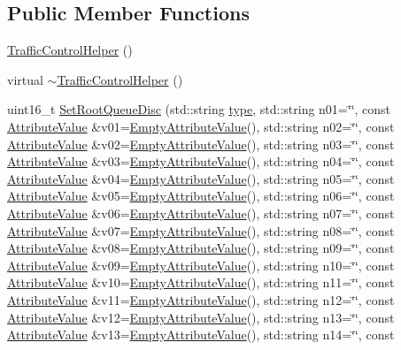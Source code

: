 \subsection*{Public Member Functions}
\begin{DoxyCompactItemize}
\item 
\hyperlink{classns3_1_1TrafficControlHelper_a291d5d95b297d432d58e71c7b111c33a}{Traffic\+Control\+Helper} ()
\item 
virtual \hyperlink{classns3_1_1TrafficControlHelper_a517f0ded11b5bfb23f9b20731c244be9}{$\sim$\+Traffic\+Control\+Helper} ()
\item 
uint16\+\_\+t \hyperlink{classns3_1_1TrafficControlHelper_a8588aac7a08e4dc4e7bb10fa7b9e25c8}{Set\+Root\+Queue\+Disc} (std\+::string \hyperlink{visualizer-ideas_8txt_add98db9e15e2a58cf2b57623e7aa893a}{type}, std\+::string n01=\char`\"{}\char`\"{}, const \hyperlink{classns3_1_1AttributeValue}{Attribute\+Value} \&v01=\hyperlink{classns3_1_1EmptyAttributeValue}{Empty\+Attribute\+Value}(), std\+::string n02=\char`\"{}\char`\"{}, const \hyperlink{classns3_1_1AttributeValue}{Attribute\+Value} \&v02=\hyperlink{classns3_1_1EmptyAttributeValue}{Empty\+Attribute\+Value}(), std\+::string n03=\char`\"{}\char`\"{}, const \hyperlink{classns3_1_1AttributeValue}{Attribute\+Value} \&v03=\hyperlink{classns3_1_1EmptyAttributeValue}{Empty\+Attribute\+Value}(), std\+::string n04=\char`\"{}\char`\"{}, const \hyperlink{classns3_1_1AttributeValue}{Attribute\+Value} \&v04=\hyperlink{classns3_1_1EmptyAttributeValue}{Empty\+Attribute\+Value}(), std\+::string n05=\char`\"{}\char`\"{}, const \hyperlink{classns3_1_1AttributeValue}{Attribute\+Value} \&v05=\hyperlink{classns3_1_1EmptyAttributeValue}{Empty\+Attribute\+Value}(), std\+::string n06=\char`\"{}\char`\"{}, const \hyperlink{classns3_1_1AttributeValue}{Attribute\+Value} \&v06=\hyperlink{classns3_1_1EmptyAttributeValue}{Empty\+Attribute\+Value}(), std\+::string n07=\char`\"{}\char`\"{}, const \hyperlink{classns3_1_1AttributeValue}{Attribute\+Value} \&v07=\hyperlink{classns3_1_1EmptyAttributeValue}{Empty\+Attribute\+Value}(), std\+::string n08=\char`\"{}\char`\"{}, const \hyperlink{classns3_1_1AttributeValue}{Attribute\+Value} \&v08=\hyperlink{classns3_1_1EmptyAttributeValue}{Empty\+Attribute\+Value}(), std\+::string n09=\char`\"{}\char`\"{}, const \hyperlink{classns3_1_1AttributeValue}{Attribute\+Value} \&v09=\hyperlink{classns3_1_1EmptyAttributeValue}{Empty\+Attribute\+Value}(), std\+::string n10=\char`\"{}\char`\"{}, const \hyperlink{classns3_1_1AttributeValue}{Attribute\+Value} \&v10=\hyperlink{classns3_1_1EmptyAttributeValue}{Empty\+Attribute\+Value}(), std\+::string n11=\char`\"{}\char`\"{}, const \hyperlink{classns3_1_1AttributeValue}{Attribute\+Value} \&v11=\hyperlink{classns3_1_1EmptyAttributeValue}{Empty\+Attribute\+Value}(), std\+::string n12=\char`\"{}\char`\"{}, const \hyperlink{classns3_1_1AttributeValue}{Attribute\+Value} \&v12=\hyperlink{classns3_1_1EmptyAttributeValue}{Empty\+Attribute\+Value}(), std\+::string n13=\char`\"{}\char`\"{}, const \hyperlink{classns3_1_1AttributeValue}{Attribute\+Value} \&v13=\hyperlink{classns3_1_1EmptyAttributeValue}{Empty\+Attribute\+Value}(), std\+::string n14=\char`\"{}\char`\"{}, const 
\end{DoxyCompactItemize}

